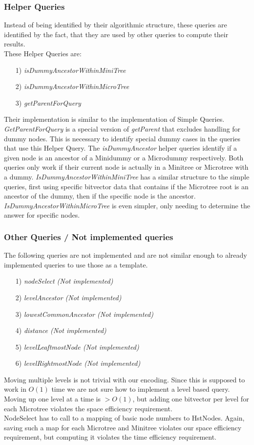 \documentclass{article}
\begin{document}
\subsubsection{Helper Queries}
Instead of being identified by their algorithmic structure, these queries are identified by the fact, that they are used by other queries to compute their results.\\
These Helper Queries are:
\begin{itemize}
	\item[1)] \textit{isDummyAncestorWithinMiniTree}
	\item[2)] \textit{isDummyAncestorWithinMicroTree}
	\item[3)] \textit{getParentForQuery}
\end{itemize}
Their implementation is similar to the implementation of Simple Queries.\\
\textit{GetParentForQuery} is a special version of \textit{getParent} that excludes handling for dummy nodes. This is necessary to identify special dummy cases in the queries that use this Helper Query.
The \textit{isDummyAncestor} helper queries identify if a given node is an ancestor of a Minidummy or a Microdummy respectively. Both queries only work if their current node is actually in a Minitree or Microtree with a dummy. \textit{IsDummyAncestorWithinMiniTree} has a similar structure to the simple queries, first using specific bitvector data that contains if the Microtree root is an ancestor of the dummy, then if the specific node is the ancestor. \textit{IsDummyAncestorWithinMicroTree} is even simpler, only needing to determine the answer for specific nodes.

\subsubsection{Other Queries / Not implemented queries}
The following queries are not implemented and are not similar enough to already implemented queries to use those as a template.
\begin{itemize}
	\item[1)] \textit{nodeSelect (Not implemented)}
	\item[2)] \textit{levelAncestor (Not implemented)}
	\item[3)] \textit{lowestCommonAncestor (Not implemented)}
	\item[4)] \textit{distance (Not implemented)}
	\item[5)] \textit{levelLeaftmostNode (Not implemented)}
	\item[6)] \textit{levelRightmostNode (Not implemented)}
\end{itemize}
Moving multiple levels is not trivial with our encoding. Since this is supposed to work in $O(1)$ time we are not sure how to implement a level based query. Moving up one level at a time is $> O(1)$, but adding one bitvector per level for each Microtree violates the space efficiency requirement.\\
NodeSelect has to call to a mapping of basic node numbers to HstNodes. Again, saving such a map for each Microtree and Minitree violates our space efficiency requirement, but computing it violates the time efficiency requirement.
\end{document}
